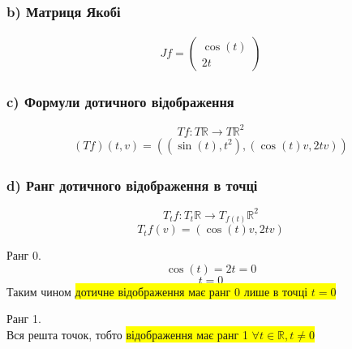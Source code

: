 \documentclass[10pt, a4paper]{article} %
\newcommand{\R}{\mathbb{R}}
\begin{document}
\subsubsection*{b) Матриця Якобі}
\begin{align*}
    Jf = \begin{pmatrix}
        \cos(t) \\ 2t
    \end{pmatrix}
\end{align*}

\subsubsection*{c) Формули дотичного відображення}
\[Tf : T\R \to T\R^2\]
\begin{align*}
    (Tf)(t, v) = \left((\sin(t), t^2), (\cos(t)v, 2tv)\right)
\end{align*}

\subsubsection*{d) Ранг дотичного відображення в точці}
\[T_{t}f: T_{t}\R \to T_{f(t)}\R^2\]
\[T_{t}f(v) = (\cos(t)v, 2tv)\]

Ранг 0.
\[\cos(t) = 2t = 0\]
\[t = 0\]
Таким чином \colorbox{yellow}{дотичне відображення має ранг 0 лише в точці $t=0$}

Ранг 1.\\
Вся решта точок, тобто \colorbox{yellow}{відображення має ранг 1 $\forall t \in \R, t\ne 0$}
\end{document}
